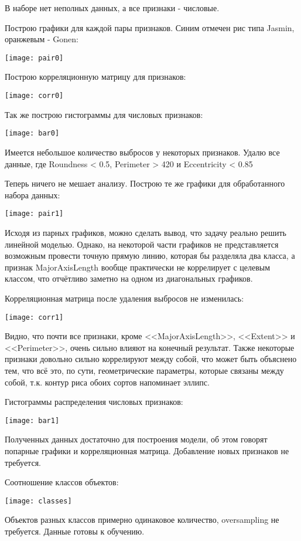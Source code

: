 В наборе нет неполных данных, а все признаки - числовые.
\pagebreak

Построю графики для каждой пары признаков. Синим отмечен рис типа Jasmin, оранжевым - Gonen:
\begin{center}
\texttt{[image: pair0]}
\end{center}\pagebreak

Построю корреляционную матрицу для признаков:
\begin{center}
\texttt{[image: corr0]}
\end{center}
Так же построю гистограммы для числовых признаков:
\begin{center}
\texttt{[image: bar0]}
\end{center}
Имеется небольшое количество выбросов у некоторых признаков. Удалю все данные, где Roundness < 0.5, Perimeter > 420 и Eccentricity < 0.85 
\pagebreak

Теперь ничего не мешает анализу. Построю те же графики для обработанного набора данных:
\begin{center}
\texttt{[image: pair1]}
\end{center}
Исходя из парных графиков, можно сделать вывод, что задачу реально решить линейной моделью. Однако, на некоторой части графиков не представляется
возможным провести точную прямую линию, которая бы разделяла два класса, а признак MajorAxisLength вообще практически не коррелирует с целевым классом,
что отчётливо заметно на одном из диагональных графиков.
\pagebreak

Корреляционная матрица после удаления выбросов не изменилась:
\begin{center}
\texttt{[image: corr1]}
\end{center}
Видно, что почти все признаки, кроме <<MajorAxisLength>>, <<Extent>> и <<Perimeter>>, очень сильно влияют на конечный результат. Также некоторые признаки
довольно сильно коррелируют между собой, что может быть объяснено тем, что всё это, по сути, геометрические параметры, которые связаны между собой, т.к. контур
риса обоих сортов напоминает эллипс.

Гистограммы распределения числовых признаков:
\begin{center}
\texttt{[image: bar1]}
\end{center}
Полученных данных достаточно для построения модели, об этом говорят попарные графики и корреляционная матрица. Добавление новых признаков не требуется.

\pagebreak

Соотношение классов объектов:
\begin{center}
\texttt{[image: classes]}
\end{center}
Объектов разных классов примерно одинаковое количество, oversampling не требуется. Данные готовы к обучению.

\pagebreak

